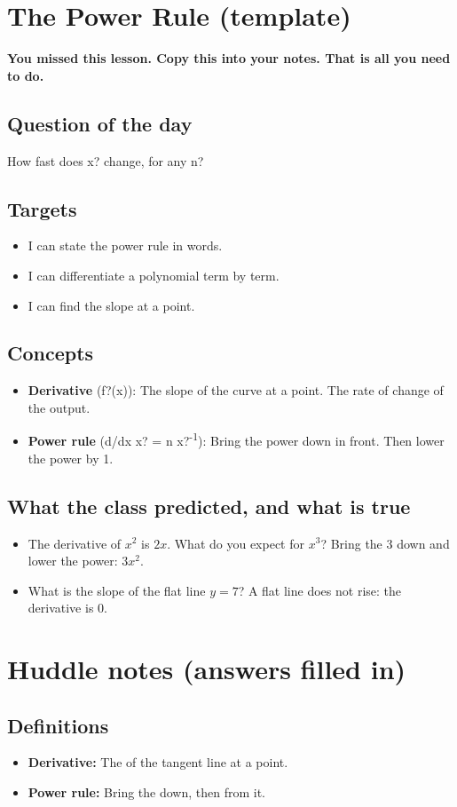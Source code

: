 \documentclass[11pt]{article}
\begin{document}
\section*{The Power Rule (template)}
\textbf{You missed this lesson. Copy this into your notes. That is all you need to do.}\par\medskip
\subsection*{Question of the day}
How fast does x? change, for any n?\par
\subsection*{Targets}\begin{itemize}\item I can state the power rule in words.
\item I can differentiate a polynomial term by term.
\item I can find the slope at a point.\end{itemize}
\subsection*{Concepts}\begin{itemize}
\item \textbf{Derivative} (f?(x)): The slope of the curve at a point. The rate of change of the output.
\item \textbf{Power rule} (d/dx x? = n x?\textsuperscript{-1}): Bring the power down in front. Then lower the power by 1.
\end{itemize}
\subsection*{What the class predicted, and what is true}\begin{itemize}
\item The derivative of $x^2$ is $2x$. What do you expect for $x^3$?  Bring the 3 down and lower the power: $3x^2$.
\item What is the slope of the flat line $y=7$?  A flat line does not rise: the derivative is 0.
\end{itemize}
\section*{Huddle notes (answers filled in)}
\subsection*{Definitions}\begin{itemize}
\item \textbf{Derivative:} The  of the tangent line at a point.
\item \textbf{Power rule:} Bring the  down, then  from it.
\end{itemize}
\end{document}

